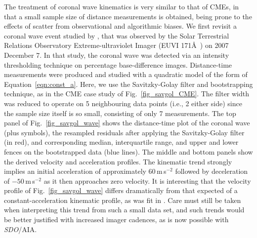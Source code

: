 \documentclass[structabstract]{aa}
\begin{document}
The treatment of coronal wave kinematics is very similar to that of CMEs, in that a small sample size of distance measurements is obtained, being prone to the effects of scatter from observational and algorithmic biases. We first revisit a coronal wave event studied by \citet{2011A&A...531A..42L}, that was observed by the Solar Terrestrial Relations Observatory \citep[\emph{STEREO};][]{2008SSRv..136....5K} Extreme-ultraviolet Imager (EUVI 171\AA\ ) on 2007 December 7. In that study, the coronal wave was detected via an intensity thresholding technique on percentage base-difference images. Distance-time measurements were produced and studied with a quadratic model of the form of Equation~\ref{eqn:const_a}. Here, we use the Savitzky-Golay filter and bootstrapping technique, as in the CME case study of Fig.~\ref{fig_savgol_CME}. The filter width was reduced to operate on 5 neighbouring data points (i.e., 2 either side) since the sample size itself is so small, consisting of only 7 measurements. The top panel of Fig.~\ref{fig_savgol_wave} shows the distance-time plot of the coronal wave (plus symbols), the resampled residuals after applying the Savitzky-Golay filter (in red), and corresponding median, interquartile range, and upper and lower fences on the bootstrapped data (blue lines). The middle and bottom panels show the derived velocity and acceleration profiles. The kinematic trend strongly implies an initial acceleration of approximately 60\,m\,s$^{-2}$ followed by deceleration of $-50$\,m\,s$^{-2}$ as it then approaches zero velocity. It is interesting that the velocity profile of Fig.~\ref{fig_savgol_wave} differs dramatically from that expected of a constant-acceleration kinematic profile, as was fit in \citet{2011A&A...531A..42L}. Care must still be taken when interpreting this trend from such a small data set, and such trends would be better justified with increased imager cadences, as is now possible with \emph{SDO}/AIA.
\end{document}
